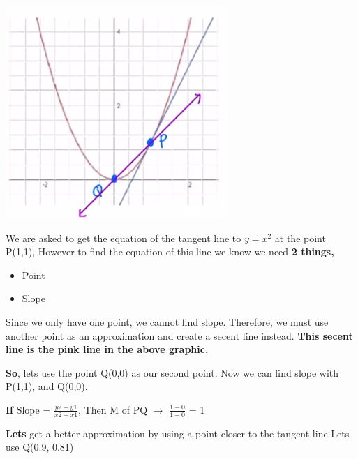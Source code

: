 \documentclass{report}
\begin{document}
    \bigbreak \noindent 
    \begin{center}
        \includegraphics[scale=0.8]{14.png}    
    \end{center}
    

    We are asked to get the equation of the tangent line to $y=x^2$ at the point P(1,1), 
    However to find the equation of this line we know we need \textbf{2 things,} 
    \begin{itemize}
        \item Point
        \item Slope
    \end{itemize}

    \noindent Since we only have one point, we cannot find slope. Therefore, we must use 
    another point as an approximation and create a secent line instead. \textbf{This secent line is 
    the pink line in the above graphic.}
    
    \bigbreak \noindent 
    \textbf{So}, lets use the point Q(0,0) as our second point. Now we can find slope with 
    P(1,1), and Q(0,0).

    \bigbreak \noindent 
    \begin{large}
        \textbf{If} Slope = $\frac{y2-y1}{x2-x1}$, Then M of PQ $\rightarrow$ $ \frac{1-0}{1-0}$ = 1
    \end{large}

    \bigbreak \noindent 
    \textbf{Lets} get a better approximation by using a point closer to the tangent line
    Lets use Q(0.9, 0.81)
\end{document}
